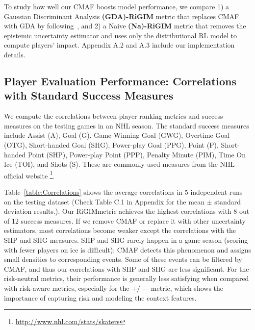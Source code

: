 \documentclass{article}
\newcommand{\sys}{RiGIM}
\newcommand{\system}{\sys\;}
\begin{document}
To study how well our CMAF boosts model performance, we compare 1) a Gaussian Discriminant Analysis {\bf (GDA)-\system} metric that replaces CMAF with GDA by following~\cite{Mukhoti2021Uncertainty}, and 2) a Naive {\bf (Na)-\system} metric that removes the epistemic uncertainty estimator and uses only the distributional RL model to compute players' impact. Appendix A.2 and A.3 include our implementation details.

\subsection{Player Evaluation Performance: Correlations with Standard Success Measures}

We compute the correlations between player ranking metrics and success measures on the testing games in an NHL season. The standard success measures include Assist (A), Goal (G), Game Winning Goal (GWG), Overtime Goal
(OTG), Short-handed Goal (SHG), Power-play Goal (PPG),
Point (P), Short-handed Point (SHP), Power-play Point
(PPP),  Penalty Minute (PIM), Time On Ice (TOI), and Shots (S). These
are commonly used measures from the NHL official website \footnote{\url{http://www.nhl.com/stats/skaters}}.

Table~\ref{table:Correlations} shows the average correlations in 5 independent runs on the testing dataset (Check Table C.1 in Appendix for the mean $\pm$ standard deviation results.). Our \system metric achieves the highest correlations with 8 out of 12 success measures. If we remove CMAF or replace it with other uncertainty estimators, most correlations become weaker except the correlations with the SHP and SHG measures. SHP and SHG rarely happen in a game season (scoring with fewer players on ice is difficult); CMAF detects this phenomenon and assigns small densities to corresponding events. Some of these events can be filtered by CMAF, and thus our correlations with SHP and SHG are less significant. For the risk-neutral metrics, their performance is generally less satisfying when compared with risk-aware metrics, especially for the $+/-$ metric, which shows the importance of capturing risk and modeling the context features.
\end{document}
